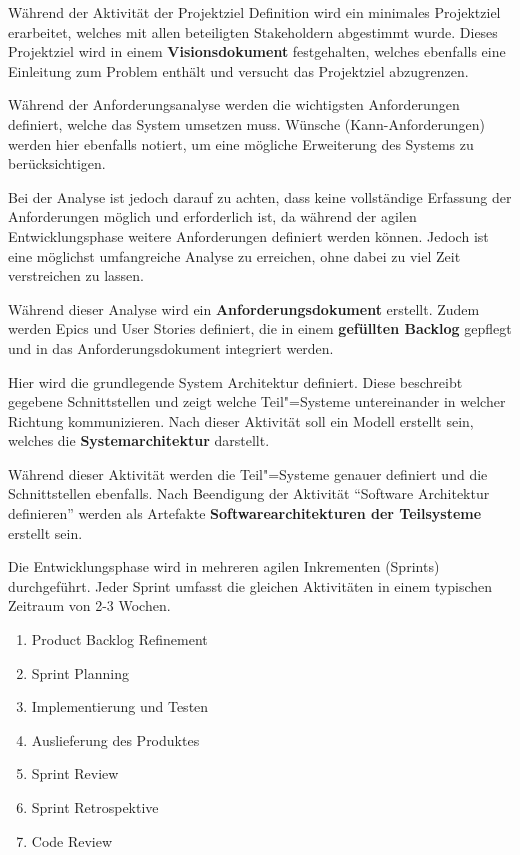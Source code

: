 Während der Aktivität der Projektziel Definition wird ein minimales Projektziel erarbeitet, welches mit allen beteiligten Stakeholdern abgestimmt wurde.
Dieses Projektziel wird in einem \textbf{Visionsdokument} festgehalten, welches ebenfalls eine Einleitung zum Problem enthält und versucht das Projektziel abzugrenzen.

Während der Anforderungsanalyse werden die wichtigsten Anforderungen definiert, welche das System umsetzen muss.
Wünsche (Kann-Anforderungen) werden hier ebenfalls notiert, um eine mögliche Erweiterung des Systems zu berücksichtigen.

Bei der Analyse ist jedoch darauf zu achten, dass keine vollständige Erfassung der Anforderungen möglich und erforderlich ist, da während der agilen Entwicklungsphase weitere Anforderungen definiert werden können.
Jedoch ist eine möglichst umfangreiche Analyse zu erreichen, ohne dabei zu viel Zeit verstreichen zu lassen.

Während dieser Analyse wird ein \textbf{Anforderungsdokument} erstellt.
Zudem werden Epics und User Stories definiert, die in einem \textbf{gefüllten Backlog} gepflegt und in das Anforderungsdokument integriert werden.

Hier wird die grundlegende System Architektur definiert.
Diese beschreibt gegebene Schnittstellen und zeigt welche Teil"=Systeme untereinander in welcher Richtung kommunizieren.
Nach dieser Aktivität soll ein Modell erstellt sein, welches die \textbf{Systemarchitektur} darstellt. 

Während dieser Aktivität werden die Teil"=Systeme genauer definiert und die Schnittstellen ebenfalls.
Nach Beendigung der Aktivität "`Software Architektur definieren"' werden als Artefakte \textbf{Softwarearchitekturen der Teilsysteme} erstellt sein.

Die Entwicklungsphase wird in mehreren agilen Inkrementen (Sprints) durchgeführt.
Jeder Sprint umfasst die gleichen Aktivitäten in einem typischen Zeitraum von 2-3 Wochen.
\begin{enumerate}
	\item Product Backlog Refinement
	\item Sprint Planning
	\item Implementierung und Testen
	\item Auslieferung des Produktes
	\item Sprint Review
	\item Sprint Retrospektive 
	\item Code Review
\end{enumerate}

